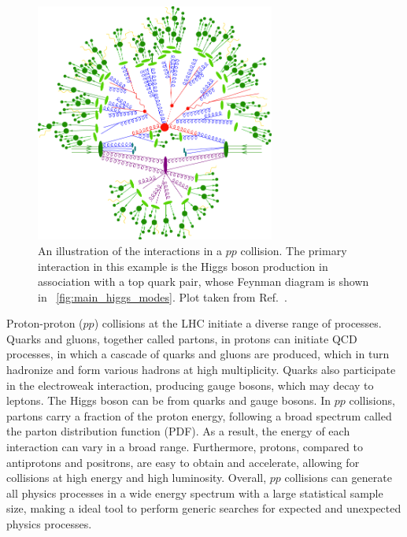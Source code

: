 \begin{figure}[!htb]
    \centering
    \captionsetup{justification=justified}
    \includegraphics[width=0.70\textwidth]{pics/LHC_CMS/sherpa_sim.png}
    \caption{An illustration of the interactions in a $pp$ collision.
             The primary interaction in this example is the Higgs boson production in association with a top quark pair, 
             whose Feynman diagram is shown in ~\ref{fig:main_higgs_modes}.
             Plot taken from Ref.~\cite{Gleisberg_2009}.}
    \label{fig:sherpa_pp}
\end{figure}

Proton-proton ($pp$) collisions at the LHC initiate a diverse range of processes.
Quarks and gluons, together called partons, in protons can initiate QCD processes, 
in which a cascade of quarks and gluons are produced, which in turn hadronize and form various hadrons at high multiplicity.
Quarks also participate in the electroweak interaction, producing gauge bosons, which may decay to leptons.
The Higgs boson can be from quarks and gauge bosons.
In $pp$ collisions, partons carry a fraction of the proton energy, 
following a broad spectrum called the parton distribution function (PDF).
As a result, the energy of each interaction can vary in a broad range.
Furthermore, protons, compared to antiprotons and positrons, are easy to obtain and accelerate,
allowing for collisions at high energy and high luminosity.
Overall, $pp$ collisions can generate all physics processes in a wide energy spectrum with a large statistical sample size, 
making a ideal tool to perform generic searches for expected and unexpected physics processes. 

